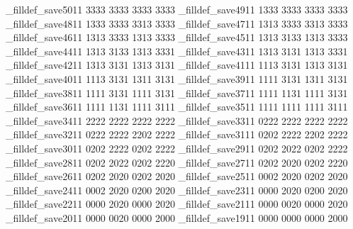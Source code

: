 \brl@pgf_filldef_save{50}{1}{1}{%
  {3333}%
  {3333}%
  {3333}%
  {3333}%
}
\brl@pgf_filldef_save{49}{1}{1}{%
  {1333}%
  {3333}%
  {3333}%
  {3333}%
}
\brl@pgf_filldef_save{48}{1}{1}{%
  {1333}%
  {3333}%
  {3313}%
  {3333}%
}
\brl@pgf_filldef_save{47}{1}{1}{%
  {1313}%
  {3333}%
  {3313}%
  {3333}%
}
\brl@pgf_filldef_save{46}{1}{1}{%
  {1313}%
  {3333}%
  {1313}%
  {3333}%
}
\brl@pgf_filldef_save{45}{1}{1}{%
  {1313}%
  {3133}%
  {1313}%
  {3333}%
}
\brl@pgf_filldef_save{44}{1}{1}{%
  {1313}%
  {3133}%
  {1313}%
  {3331}%
}
\brl@pgf_filldef_save{43}{1}{1}{%
  {1313}%
  {3131}%
  {1313}%
  {3331}%
}
\brl@pgf_filldef_save{42}{1}{1}{%
  {1313}%
  {3131}%
  {1313}%
  {3131}%
}
\brl@pgf_filldef_save{41}{1}{1}{%
  {1113}%
  {3131}%
  {1313}%
  {3131}%
}
\brl@pgf_filldef_save{40}{1}{1}{%
  {1113}%
  {3131}%
  {1311}%
  {3131}%
}
\brl@pgf_filldef_save{39}{1}{1}{%
  {1111}%
  {3131}%
  {1311}%
  {3131}%
}
\brl@pgf_filldef_save{38}{1}{1}{%
  {1111}%
  {3131}%
  {1111}%
  {3131}%
}
\brl@pgf_filldef_save{37}{1}{1}{%
  {1111}%
  {1131}%
  {1111}%
  {3131}%
}
\brl@pgf_filldef_save{36}{1}{1}{%
  {1111}%
  {1131}%
  {1111}%
  {3111}%
}
\brl@pgf_filldef_save{35}{1}{1}{%
  {1111}%
  {1111}%
  {1111}%
  {3111}%
}
\brl@pgf_filldef_save{34}{1}{1}{%
  {2222}%
  {2222}%
  {2222}%
  {2222}%
}
\brl@pgf_filldef_save{33}{1}{1}{%
  {0222}%
  {2222}%
  {2222}%
  {2222}%
}
\brl@pgf_filldef_save{32}{1}{1}{%
  {0222}%
  {2222}%
  {2202}%
  {2222}%
}
\brl@pgf_filldef_save{31}{1}{1}{%
  {0202}%
  {2222}%
  {2202}%
  {2222}%
}
\brl@pgf_filldef_save{30}{1}{1}{%
  {0202}%
  {2222}%
  {0202}%
  {2222}%
}
\brl@pgf_filldef_save{29}{1}{1}{%
  {0202}%
  {2022}%
  {0202}%
  {2222}%
}
\brl@pgf_filldef_save{28}{1}{1}{%
  {0202}%
  {2022}%
  {0202}%
  {2220}%
}
\brl@pgf_filldef_save{27}{1}{1}{%
  {0202}%
  {2020}%
  {0202}%
  {2220}%
}
\brl@pgf_filldef_save{26}{1}{1}{%
  {0202}%
  {2020}%
  {0202}%
  {2020}%
}
\brl@pgf_filldef_save{25}{1}{1}{%
  {0002}%
  {2020}%
  {0202}%
  {2020}%
}
\brl@pgf_filldef_save{24}{1}{1}{%
  {0002}%
  {2020}%
  {0200}%
  {2020}%
}
\brl@pgf_filldef_save{23}{1}{1}{%
  {0000}%
  {2020}%
  {0200}%
  {2020}%
}
\brl@pgf_filldef_save{22}{1}{1}{%
  {0000}%
  {2020}%
  {0000}%
  {2020}%
}
\brl@pgf_filldef_save{21}{1}{1}{%
  {0000}%
  {0020}%
  {0000}%
  {2020}%
}
\brl@pgf_filldef_save{20}{1}{1}{%
  {0000}%
  {0020}%
  {0000}%
  {2000}%
}
\brl@pgf_filldef_save{19}{1}{1}{%
  {0000}%
  {0000}%
  {0000}%
  {2000}%
}

